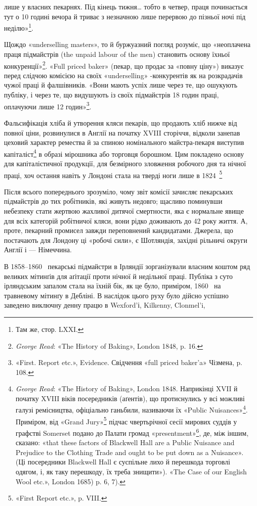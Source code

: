\parcont{}  %
лише у власних пекарнях. Під кінець тижня\dots{} тобто в четвер,
праця починається тут о 10 годині вечора й триває з незначною
лише перервою до пізньої ночі під неділю»\footnote{
Там же, стор. LXXI.
}.

Щождо «underselling masters», то й буржуазний погляд розуміє,
що «неоплачена праця підмайстрів (the unpaid labour of
the men) становить основу їхньої конкуренції»\footnote{
\emph{George Read}: «The History of Baking», London 1848, p. 16.
}. «Full priced
baker» (пекар, що продає за «повну ціну») виказує перед слідчою
комісією на своїх «underselling» -конкурентів як на розкрадачів
чужої праці й фалшівників. «Вони мають успіх лише
через те, що ошукують публіку, і через те, що видушують із
своїх підмайстрів 18 годин праці, оплачуючи лише 12 годин»\footnote{
«First. Report etc.», Evidence. Свідчення «full priced baker’a» Чізмена,
p. 108.
}.

Фальсифікація хліба й утворення кляси пекарів, що продають
хліб нижче від повної ціни, розвинулися в Англії на початку
XVIII сторіччя, відколи занепав цеховий характер ремества й
за спиною номінального майстра-пекаря виступив капіталіст\footnote{
\emph{George Read}: «The History of Baking», London 1848. Наприкінці
XVII й початку XVIII віків посередників (аґентів), що протиснулись
у всі можливі галузі ремісництва, офіціально ганьбили, називаючи
їх «Public Nuisances»\footnote*{суспільним лихом. \emph{Ред.}}.
Приміром, від «Grand Jury»\footnote*{Велике жюрі — суд присяжних. \emph{Ред.}}
підчас чвертьрічної
сесії мирових суддів у графстві Somerset подано до Палати громад
«presentment»\footnote*{внесення. \emph{Ред.}},
де, між іншим, сказано: «that these factors of Blackwell Hall
are a Public Nuisance and Prejudice to the Clothing Trade and ought to be
put down as a Nuisance». (Ці посередники Blackwell Hall є суспільне лихо
й перешкода торговлі одягом, і, як таку перешкоду, їх треба знищити»).
«The Case of our English Wool etc.», London 1685) p. 6, 7).
} в образі мірошника або торговця борошном. Цим покладено основу
для капіталістичної продукції, для безмірного зловження робочого
дня та нічної праці, хоч остання навіть у Лондоні стала на тверді
ноги лише в 1824~\footnote{«First Report etc.», p. VIII.}

Після всього попереднього зрозуміло, чому звіт комісії зачисляє
пекарських підмайстрів до тих робітників, які живуть
недовго; щасливо поминувши небезпеку стати жертвою жахливої
дитячої смертности, яка є нормальне явище для всіх категорій
робітничої кляси, вони рідко доживають до 42 року життя. А, проте,
пекарний промисел завжди переповнений кандидатами. Джерела,
що постачають для Лондону ці «робочі сили», є Шотляндія, західні
рільничі округи Англії і — Німеччина.

В 1858--1860~ пекарські підмайстри в Ірляндії зорганізували
власним коштом ряд великих мітинґів для аґітації проти
нічної й недільної праці. Публіка з суто ірляндським запалом
стала на їхній бік, як це було, приміром, 1860~ на травневому
мітинґу в Дебліні. В наслідок цього руху було дійсно успішно
заведено виключну денну працю в Wexford’і, Kilkenny, Clonmel’i,
\parbreak{}  %
